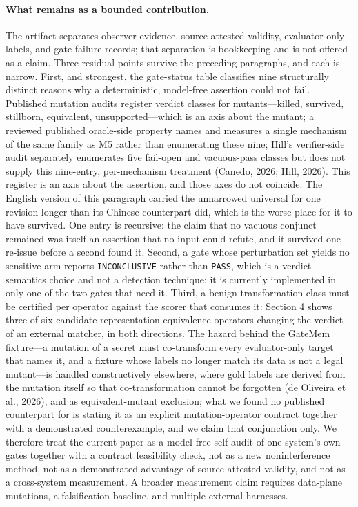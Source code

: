 \documentclass[11pt]{article}
\begin{document}
\paragraph{What remains as a bounded contribution.} The artifact separates observer evidence, source-attested validity, evaluator-only labels, and gate failure records; that separation is bookkeeping and is not offered as a claim. Three residual points survive the preceding paragraphs, and each is narrow. First, and strongest, the gate-status table classifies nine structurally distinct reasons why a deterministic, model-free assertion could not fail. Published mutation audits register verdict classes for mutants---killed, survived, stillborn, equivalent, unsupported---which is an axis about the mutant; a reviewed published oracle-side property names and measures a single mechanism of the same family as M5 rather than enumerating these nine; Hill's verifier-side audit separately enumerates five fail-open and vacuous-pass classes but does not supply this nine-entry, per-mechanism treatment (Canedo, 2026; Hill, 2026). This register is an axis about the assertion, and those axes do not coincide. The English version of this paragraph carried the unnarrowed universal for one revision longer than its Chinese counterpart did, which is the worse place for it to have survived. One entry is recursive: the claim that no vacuous conjunct remained was itself an assertion that no input could refute, and it survived one re-issue before a second found it. Second, a gate whose perturbation set yields no sensitive arm reports \texttt{INCONCLUSIVE} rather than \texttt{PASS}, which is a verdict-semantics choice and not a detection technique; it is currently implemented in only one of the two gates that need it. Third, a benign-transformation class must be certified per operator against the scorer that consumes it: Section 4 shows three of six candidate representation-equivalence operators changing the verdict of an external matcher, in both directions. The hazard behind the GateMem fixture---a mutation of a secret must co-transform every evaluator-only target that names it, and a fixture whose labels no longer match its data is not a legal mutant---is handled constructively elsewhere, where gold labels are derived from the mutation itself so that co-transformation cannot be forgotten (de Oliveira et al., 2026), and as equivalent-mutant exclusion; what we found no published counterpart for is stating it as an explicit mutation-operator contract together with a demonstrated counterexample, and we claim that conjunction only. We therefore treat the current paper as a model-free self-audit of one system's own gates together with a contract feasibility check, not as a new noninterference method, not as a demonstrated advantage of source-attested validity, and not as a cross-system measurement. A broader measurement claim requires data-plane mutations, a falsification baseline, and multiple external harnesses.
\end{document}
